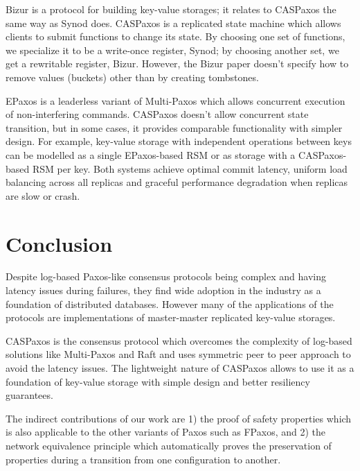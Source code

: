 \documentclass[12pt]{article}
\theoremstyle{definition}
\begin{document}
Bizur\cite{bizur} is a protocol for building key-value storages; it relates to CASPaxos the same way as Synod does. CASPaxos is a replicated state machine which allows clients to submit functions to change its state. By choosing one set of functions, we specialize it to be a write-once register, Synod; by choosing another set, we get a rewritable register, Bizur. However, the Bizur paper doesn't specify how to remove values (buckets) other than by creating tombstones.

EPaxos\cite{epaxos} is a leaderless variant of Multi-Paxos which allows concurrent execution of non-interfering commands. CASPaxos doesn't allow concurrent state transition, but in some cases, it provides comparable functionality with simpler design. For example, key-value storage with independent operations between keys can be modelled as a single EPaxos-based RSM or as storage with a CASPaxos-based RSM per key. Both systems achieve optimal commit latency, uniform load balancing across all replicas and graceful performance degradation when replicas are slow or crash.

\section{Conclusion}

Despite log-based Paxos-like consensus protocols being complex and having latency
issues during failures, they find wide adoption in the industry as a foundation of distributed databases. However many of the applications of the protocols are implementations of master-master replicated key-value storages.

CASPaxos is the consensus protocol which overcomes the complexity of log-based solutions like Multi-Paxos and Raft and uses symmetric peer to peer approach to avoid the latency issues. The lightweight nature of CASPaxos allows to use it as a foundation of key-value storage with simple design and better resiliency guarantees.

The indirect contributions of our work are 1) the proof of safety properties which is also applicable to the other variants of Paxos such as FPaxos, and 2) the network equivalence principle which automatically proves the preservation of properties during a transition from one configuration to another.



\end{document}
